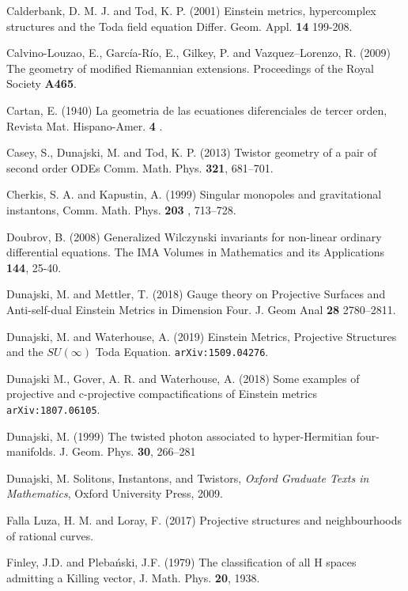 \begin{thebibliography}{}
 Calderbank, D. M. J. and Tod,  K. P. (2001)
Einstein metrics, hypercomplex structures and the Toda field equation
Differ. Geom. Appl. {\bf 14}  199-208.


 Calvino-Louzao, E., Garc\' ia-R\' io, E., Gilkey, P. and Vazquez--Lorenzo, R. (2009) The geometry of modified Riemannian extensions. Proceedings of the Royal Society {\bf A465}.

 Cartan, E. (1940) {La geometria de las ecuationes diferenciales de tercer
orden}, Revista Mat. Hispano-Amer. {\bf 4} .


 Casey, S., Dunajski, M. and Tod, K. P. (2013)
Twistor geometry of a pair of second order ODEs 
Comm. Math. Phys. { \bf 321}, 681--701.



 Cherkis, S. A.  and Kapustin, A. (1999) Singular monopoles and gravitational
instantons, Comm. Math. Phys. {\bf 203} , 713–728.


Doubrov, B. (2008) Generalized Wilczynski invariants for non-linear ordinary differential equations.
The IMA Volumes in Mathematics and its Applications {\bf 144}, 25-40.

 Dunajski, M. and Mettler, T. (2018) Gauge theory on Projective Surfaces and Anti-self-dual Einstein Metrics in Dimension Four.  
 J. Geom Anal {\bf 28} 2780--2811.
 
 Dunajski, M. and Waterhouse, A. (2019)
Einstein Metrics, Projective Structures and the $SU(\infty)$ Toda Equation.
{\tt{arXiv:1509.04276}}.
 

 Dunajski M., Gover, A. R. and Waterhouse, A. (2018) Some examples of projective and c-projective compactifications of Einstein metrics  {\tt arXiv:1807.06105}.

 Dunajski, M. (1999) The twisted photon associated to hyper-Hermitian four-manifolds. J. Geom. Phys. {\bf 30}, 266--281

 Dunajski, M. Solitons, Instantons, and Twistors, {\em Oxford Graduate Texts in Mathematics}, Oxford University Press, 2009.

 Falla Luza, H. M. and Loray, F. (2017)  Projective structures and neighbourhoods of rational curves.

 Finley, J.D. and Pleba\'nski, J.F. (1979) The classification of all H spaces admitting a Killing
vector, J. Math. Phys. {\bf 20}, 1938.


\end{thebibliography}
